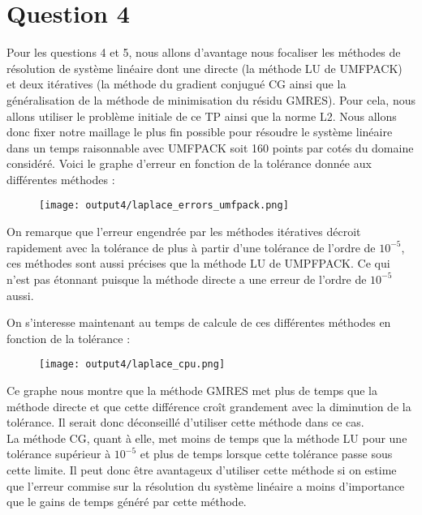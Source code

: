 \documentclass[11pt,a4paper]{report}
\begin{document}
			\section*{Question 4}
				
				Pour les questions 4 et 5, nous allons d'avantage nous focaliser les méthodes de résolution de système linéaire dont une directe (la méthode LU de UMFPACK) et deux itératives (la méthode du gradient conjugué CG ainsi que la généralisation de la méthode de minimisation du résidu GMRES). 
				Pour cela, nous allons utiliser le problème initiale de ce TP ainsi que la norme L2.
				Nous allons donc fixer notre maillage le plus fin possible pour résoudre le système linéaire dans un temps raisonnable avec UMFPACK soit 160 points par cotés du domaine considéré. 
				Voici le graphe d'erreur en fonction de la tolérance donnée aux différentes méthodes :
											
				\begin{figure}[H]
					\centering
					\texttt{[image: output4/laplace\_errors\_umfpack.png]}				
				\end{figure}

				On remarque que l'erreur engendrée par les méthodes itératives décroit rapidement avec la tolérance de plus à partir d'une tolérance de l'ordre de $10^{-5}$, ces méthodes sont aussi précises que la méthode LU de UMPFPACK. Ce qui n'est pas étonnant puisque la méthode directe a une erreur de l'ordre de $10^{-5}$ aussi.
				
				On s'interesse maintenant au temps de calcule de ces différentes méthodes en fonction de la tolérance :

				\begin{figure}[H]
					\centering
					\texttt{[image: output4/laplace\_cpu.png]}				
				\end{figure}
				
				Ce graphe nous montre que la méthode GMRES met plus de temps que la méthode directe et que cette différence croît grandement avec la diminution de la tolérance. Il serait donc déconseillé d'utiliser cette méthode dans ce cas.\\
				La méthode CG, quant à elle, met moins de temps que la méthode LU pour une tolérance supérieur à $10^{-5}$ et plus de temps lorsque cette tolérance passe sous cette limite. Il peut donc être avantageux d'utiliser cette méthode si on estime que l'erreur commise sur la résolution du système linéaire a moins d'importance que le gains de temps généré par cette méthode.
			
\end{document}
